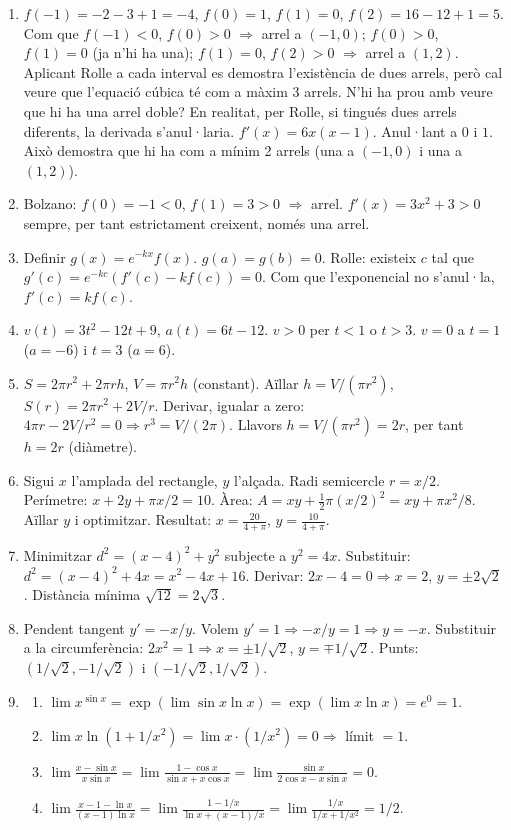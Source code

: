 \documentclass[12pt]{article}
\begin{document}
\begin{enumerate}[label=\arabic*.]
    \item $f(-1)= -2-3+1=-4$, $f(0)=1$, $f(1)=0$, $f(2)=16-12+1=5$. Com que $f(-1)<0$, $f(0)>0$ $\Rightarrow$ arrel a $(-1,0)$; $f(0)>0$, $f(1)=0$ (ja n'hi ha una); $f(1)=0$, $f(2)>0$ $\Rightarrow$ arrel a $(1,2)$. Aplicant Rolle a cada interval es demostra l'existència de dues arrels, però cal veure que l'equació cúbica té com a màxim 3 arrels. N'hi ha prou amb veure que hi ha una arrel doble? En realitat, per Rolle, si tingués dues arrels diferents, la derivada s'anul·laria. $f'(x)=6x(x-1)$. Anul·lant a $0$ i $1$. Això demostra que hi ha com a mínim 2 arrels (una a $(-1,0)$ i una a $(1,2)$).
    \item Bolzano: $f(0)=-1<0$, $f(1)=3>0$ $\Rightarrow$ arrel. $f'(x)=3x^2+3>0$ sempre, per tant estrictament creixent, només una arrel.
    \item Definir $g(x)=e^{-kx}f(x)$. $g(a)=g(b)=0$. Rolle: existeix $c$ tal que $g'(c)=e^{-kc}(f'(c)-k f(c))=0$. Com que l'exponencial no s'anul·la, $f'(c)=k f(c)$.
    \item $v(t)=3t^2-12t+9$, $a(t)=6t-12$. $v>0$ per $t<1$ o $t>3$. $v=0$ a $t=1$ ($a=-6$) i $t=3$ ($a=6$).

    \item $S=2\pi r^2+2\pi r h$, $V=\pi r^2 h$ (constant). Aïllar $h=V/(\pi r^2)$, $S(r)=2\pi r^2+2V/r$. Derivar, igualar a zero: $4\pi r - 2V/r^2=0 \Rightarrow r^3=V/(2\pi)$. Llavors $h=V/(\pi r^2)=2r$, per tant $h=2r$ (diàmetre).

    \item Sigui $x$ l'amplada del rectangle, $y$ l'alçada. Radi semicercle $r=x/2$. Perímetre: $x+2y+\pi x/2 = 10$. Àrea: $A=xy+\frac{1}{2}\pi (x/2)^2 = xy+\pi x^2/8$. Aïllar $y$ i optimitzar. Resultat: $x = \frac{20}{4+\pi}$, $y = \frac{10}{4+\pi}$.

    \item Minimitzar $d^2=(x-4)^2+y^2$ subjecte a $y^2=4x$. Substituir: $d^2=(x-4)^2+4x = x^2-4x+16$. Derivar: $2x-4=0 \Rightarrow x=2$, $y=\pm 2\sqrt{2}$. Distància mínima $\sqrt{12}=2\sqrt{3}$.

    \item Pendent tangent $y' = -x/y$. Volem $y'=1 \Rightarrow -x/y=1 \Rightarrow y=-x$. Substituir a la circumferència: $2x^2=1 \Rightarrow x=\pm 1/\sqrt{2}$, $y=\mp 1/\sqrt{2}$. Punts: $(1/\sqrt{2}, -1/\sqrt{2})$ i $(-1/\sqrt{2}, 1/\sqrt{2})$.

    \item 
    \begin{enumerate}[label=\alph*)]
        \item $\lim x^{\sin x} = \exp(\lim \sin x \ln x) = \exp(\lim x \ln x)=e^0=1$.
        \item $\lim x \ln(1+1/x^2) = \lim x \cdot (1/x^2) = 0 \Rightarrow$ límit $=1$.
        \item $\lim \frac{x-\sin x}{x\sin x} = \lim \frac{1-\cos x}{\sin x + x\cos x} = \lim \frac{\sin x}{2\cos x - x\sin x} = 0$.
        \item $\lim \frac{x-1-\ln x}{(x-1)\ln x} = \lim \frac{1-1/x}{\ln x + (x-1)/x} = \lim \frac{1/x}{1/x + 1/x^2} = 1/2$.
    \end{enumerate}
\end{enumerate}
\end{document}
